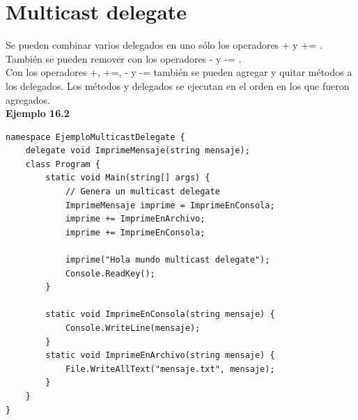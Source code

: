 \documentclass[12pt,a4paper]{report}
\begin{document}
\section{Multicast delegate}
Se pueden combinar varios delegados en uno sólo los operadores + y += . También se pueden remover con los operadores - y -= .\\Con los operadores +, +=, - y -= también se pueden agregar y quitar métodos a los delegados. Los métodos y delegados se ejecutan en el orden en los que fueron agregados.\\\textbf{Ejemplo 16.2}
\begin{lstlisting}
namespace EjemploMulticastDelegate {
    delegate void ImprimeMensaje(string mensaje);
    class Program {
        static void Main(string[] args) {
            // Genera un multicast delegate
            ImprimeMensaje imprime = ImprimeEnConsola;
            imprime += ImprimeEnArchivo;
            imprime += ImprimeEnConsola;

            imprime("Hola mundo multicast delegate");
            Console.ReadKey();
        }

        static void ImprimeEnConsola(string mensaje) {
            Console.WriteLine(mensaje);
        }
        static void ImprimeEnArchivo(string mensaje) {
            File.WriteAllText("mensaje.txt", mensaje);
        }
    }
}
\end{lstlisting}
\end{document}
